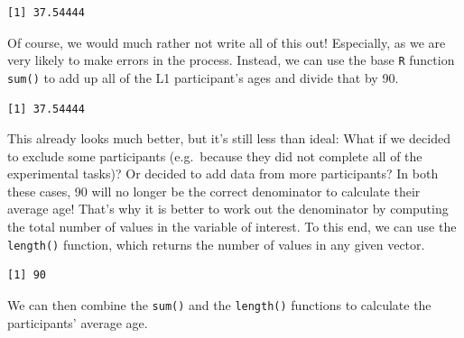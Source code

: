 \documentclass[
  letterpaper,
  DIV=11,
  numbers=noendperiod]{scrreprt}
\newenvironment{Shaded}{\begin{snugshade}}{\end{snugshade}}
\newcommand{\DecValTok}[1]{\textcolor[rgb]{0.68,0.00,0.00}{#1}}
\newcommand{\FunctionTok}[1]{\textcolor[rgb]{0.28,0.35,0.67}{#1}}
\newcommand{\NormalTok}[1]{\textcolor[rgb]{0.00,0.23,0.31}{#1}}
\newcommand{\SpecialCharTok}[1]{\textcolor[rgb]{0.37,0.37,0.37}{#1}}
\begin{document}
\begin{verbatim}
[1] 37.54444
\end{verbatim}

Of course, we would much rather not write all of this out! Especially,
as we are very likely to make errors in the process. Instead, we can use
the base \texttt{R} function \texttt{sum()} to add up all of the L1
participant's ages and divide that by 90.

\begin{Shaded}
\end{Shaded}

\begin{verbatim}
[1] 37.54444
\end{verbatim}

This already looks much better, but it's still less than ideal: What if
we decided to exclude some participants (e.g.~because they did not
complete all of the experimental tasks)? Or decided to add data from
more participants? In both these cases, 90 will no longer be the correct
denominator to calculate their average age! That's why it is better to
work out the denominator by computing the total number of values in the
variable of interest. To this end, we can use the \texttt{length()}
function, which returns the number of values in any given vector.

\begin{Shaded}
\end{Shaded}

\begin{verbatim}
[1] 90
\end{verbatim}

We can then combine the \texttt{sum()} and the \texttt{length()}
functions to calculate the participants' average age.

\begin{Shaded}
\end{Shaded}
\end{document}
